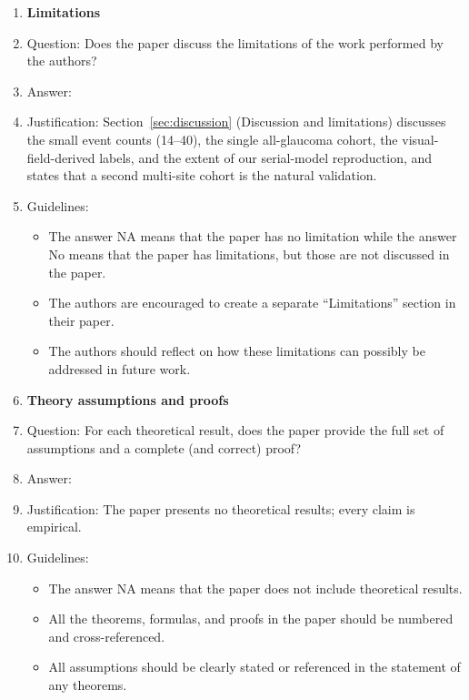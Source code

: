 \begin{enumerate}
\item {\bf Limitations}
    \item[] Question: Does the paper discuss the limitations of the work performed by the authors?
    \item[] Answer: \answerYes{}
    \item[] Justification: Section~\ref{sec:discussion} (Discussion and limitations) discusses the small event counts (\num{14}--\num{40}), the single all-glaucoma cohort, the visual-field-derived labels, and the extent of our serial-model reproduction, and states that a second multi-site cohort is the natural validation.
    \item[] Guidelines:
    \begin{itemize}
        \item The answer NA means that the paper has no limitation while the answer No means that the paper has limitations, but those are not discussed in the paper.
        \item The authors are encouraged to create a separate ``Limitations'' section in their paper.
        \item The authors should reflect on how these limitations can possibly be addressed in future work.
    \end{itemize}

\item {\bf Theory assumptions and proofs}
    \item[] Question: For each theoretical result, does the paper provide the full set of assumptions and a complete (and correct) proof?
    \item[] Answer: \answerNA{}
    \item[] Justification: The paper presents no theoretical results; every claim is empirical.
    \item[] Guidelines:
    \begin{itemize}
        \item The answer NA means that the paper does not include theoretical results.
        \item All the theorems, formulas, and proofs in the paper should be numbered and cross-referenced.
        \item All assumptions should be clearly stated or referenced in the statement of any theorems.
    \end{itemize}


\end{enumerate}
